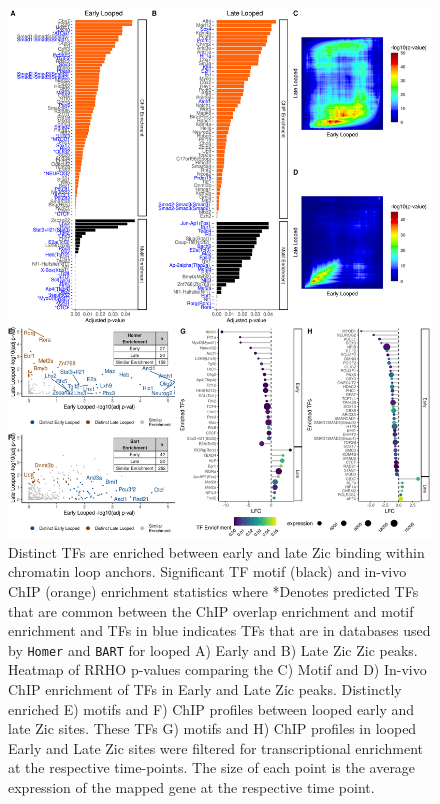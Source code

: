 \documentclass[fleqn,10pt]{wlscirep}
\begin{document}
\begin{figure}[!ht]
\centering
\includegraphics[width=.95\textwidth]{../figures/figure2_loop.png}
\caption{ Distinct TFs are enriched between early and late Zic binding within chromatin loop anchors. Significant TF motif (black) and in-vivo ChIP (orange) enrichment statistics where *Denotes predicted TFs that are common between the ChIP overlap enrichment and motif enrichment and TFs in blue indicates TFs that are in databases used by \texttt{Homer} and \texttt{BART} for looped A) Early and B) Late Zic Zic peaks.  Heatmap of RRHO p-values comparing the C) Motif and D) In-vivo ChIP enrichment of TFs in Early and Late Zic peaks. Distinctly enriched E) motifs and F) ChIP profiles between looped  early and late Zic sites. These TFs G) motifs and H) ChIP profiles in looped Early and Late Zic sites were filtered for transcriptional enrichment at the respective time-points. The size of each point is the average expression of the mapped gene at the respective time point.}
\label{fig:DistinctTFs_looped}
\end{figure}
\end{document}
